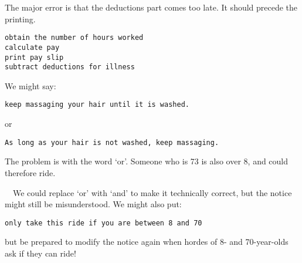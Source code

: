 		\begin{stab}
			\begin{enumChapter}
				\item The major error is that the deductions part comes too late. It should precede the printing.
					\begin{lstlisting}
obtain the number of hours worked
calculate pay
print pay slip
subtract deductions for illness
					\end{lstlisting}
				\item We might say:
					\begin{lstlisting}
keep massaging your hair until it is washed.
					\end{lstlisting}
					or
					\begin{lstlisting}
As long as your hair is not washed, keep massaging.
					\end{lstlisting}
				\item The problem is with the word ‘or’. Someone who is 73 is also over 8, and could therefore ride.

	  We could replace ‘or’ with ‘and’ to make it technically correct, but the notice might still be misunderstood. We might also put:
					\begin{lstlisting}
only take this ride if you are between 8 and 70
					\end{lstlisting}
					but be prepared to modify the notice again when hordes of 8- and 70-year-olds ask if they can ride!
			\end{enumChapter}
		\end{stab}


